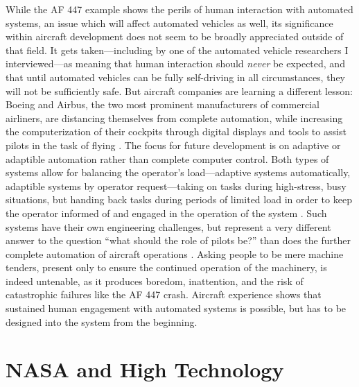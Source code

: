 While the AF 447 example shows the
perils of human interaction with automated systems, an issue which will
affect automated vehicles as well, its significance
within aircraft development does not seem to be broadly appreciated
outside of that field. It gets taken---including by one of the
automated vehicle researchers I interviewed---as meaning that human
interaction should \emph{never} be expected, and that until automated
vehicles can be fully self-driving in all circumstances, they will not
be sufficiently safe. But aircraft companies are learning a
different lesson: Boeing and Airbus, the two
most prominent manufacturers of commercial airliners, are distancing
themselves from complete automation, while increasing the computerization of
their cockpits through digital displays and tools to assist pilots in
the task of flying \cite{787dream} \cite{brownFuture}. The focus for
future development is on adaptive or adaptible automation
rather than complete computer control. Both types of systems allow for
balancing the operator's load---adaptive systems automatically,
adaptible systems by operator request---taking on tasks during
high-stress, busy situations, but handing back tasks during periods of
limited load in order to keep the operator informed of and engaged in
the operation of the system \cite{dahai}. Such systems have their own
engineering challenges, but represent a very different answer to the
question ``what should the role of pilots be?'' than does the further
complete automation of aircraft operations \cite{kaber}. Asking people to be mere machine
tenders, present only to ensure the continued operation of the
machinery, is indeed untenable, as it produces boredom,
inattention, and the risk of catastrophic failures like the AF 447
crash. Aircraft experience shows that sustained human engagement
with automated systems is possible, but has to be designed into
the system from the beginning.%


\section{NASA and High Technology}

